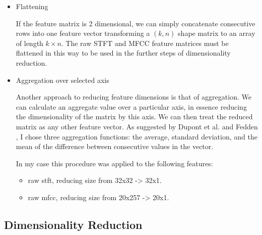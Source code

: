 \documentclass[11pt]{article}
\begin{document}
\begin{itemize}
\item Flattening

If the feature matrix is 2 dimensional, we can simply concatenate consecutive rows into one feature vector transforming a \((k,n)\) shape matrix to an array of length \(k \times n\). The raw STFT and MFCC feature matrices must be flattened in this way to be used in the further steps of dimensionality reduction.

\item Aggregation over selected axis

Another approach to reducing feature dimensions is that of aggregation. We can calculate an aggregate value over a particular axis, in essence reducing the dimensionality of the matrix by this axis. We can then treat the reduced matrix as any other feature vector. As suggested by Dupont et al. \cite{Dupont_2013} and Fedden \cite{medium}, I chose three aggregation functions: the average, standard deviation, and the mean of the difference between consecutive values in the vector.

In my case this procedure was applied to the following features:
\begin{itemize}
\item raw stft, reducing size from 32x32 -> 32x1.
\item raw mfcc, reducing size from 20x257 -> 20x1.
\end{itemize}
\end{itemize}

\subsection{Dimensionality Reduction}
\label{sec:orgfde1e30}
\end{document}
